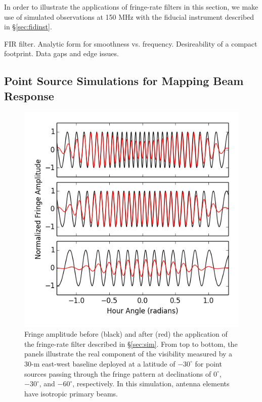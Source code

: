 \documentclass[twocolumn,apj,numberedappendix]{emulateapj}
\begin{document}
In order to illustrate the applications of fringe-rate filters in this section, we make use of
simulated observations at 150 MHz with the fiducial instrument described in \S\ref{sec:fidinst}.

FIR filter.  Analytic form for smoothness vs. frequency.
Desireability of a compact footprint.  Data gaps and edge issues.

\subsection{Point Source Simulations for Mapping Beam Response}
\label{sec:sim_pnt}

\begin{figure}\centering
\includegraphics[width=0.9\columnwidth]{plots/src_track.png}
\caption{
Fringe amplitude before (black) and after (red) the application
of the fringe-rate filter described in \S\ref{sec:sim}.  From top to bottom,
the panels illustrate the real component of the visibility measured by
a 30-m east-west baseline deployed at a latitude of $-30^\circ$ 
for point sources 
passing through the fringe pattern at declinations of $0^\circ$,
$-30^\circ$, and $-60^\circ$, respectively.  In this simulation,
antenna elements have isotropic primary beams.
}\label{fig:src_track}
\end{figure}
\end{document}
